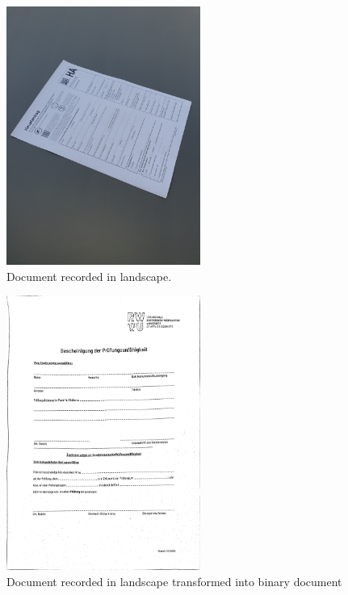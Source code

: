 \documentclass[twocolumn,10pt]{asme2ej}
\begin{document}
\begin{figure}[H]
    \centerline{\includegraphics[width=2.5in]{output/schraeg_2_1_original.jpg}}
    \caption{Document recorded in landscape.}
    \label{fig:schraeg2_original}
\end{figure}

\begin{figure}[H]
    \centerline{\includegraphics[width=2.5in]{output/schraeg_1_8_adaptive_binary_image_mean.jpg}}
    \caption{Document recorded in landscape transformed into binary document}
    \label{fig:schraeg2_binary}
\end{figure}
\end{document}

